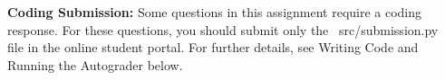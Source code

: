 {\bf Coding Submission:}
Some questions in this assignment require a coding response.  For these questions, you should submit only the ~src/submission.py~ file in the online student portal.  For further details, see Writing Code and Running the Autograder below.